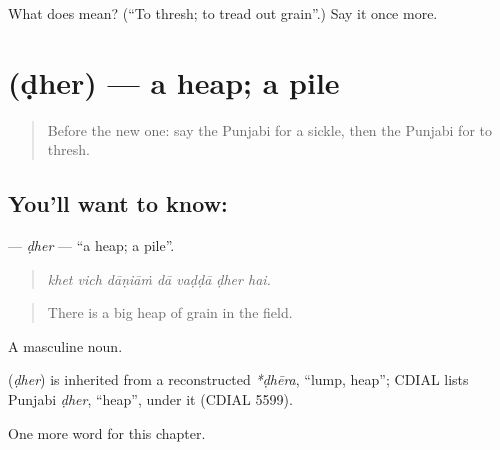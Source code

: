 \begin{tcolorbox}[breakable,colback=teal!4,colframe=teal!35!black,title={Before you move on}]
What does  mean? (\textquotedblleft{}To thresh; to tread out grain\textquotedblright{}.) Say it once more.
\end{tcolorbox}
\section[\texorpdfstring{\pa{ਢੇਰ} (ḍher)}{ਢੇਰ (ḍher)}]{ (ḍher) — a heap; a pile}

\label{lesson:PA-C305-dher}



\begin{quote}
Before the new one: say the Punjabi for a sickle, then the Punjabi for to thresh.
\end{quote}

\subsection*{You'll want to know: }
\textbf{} — \emph{ḍher} — \textquotedblleft{}a heap; a pile\textquotedblright{}.

\begin{quote}
      
\end{quote}

\begin{quote}
\emph{khet vich dāṇiāṁ dā vaḍḍā ḍher hai.}
\end{quote}

\begin{quote}
There is a big heap of grain in the field.
\end{quote}

A masculine noun.

\begin{cousinweb}
\textbf{} (\emph{ḍher}) is inherited from a reconstructed \emph{*ḍhēra}, \textquotedblleft{}lump, heap\textquotedblright{}; CDIAL lists Punjabi \emph{ḍher}, \textquotedblleft{}heap\textquotedblright{}, under it (CDIAL 5599).
\end{cousinweb}

\begin{grammarlens}[title={What you've built}]
One more word for this chapter.
\end{grammarlens}

